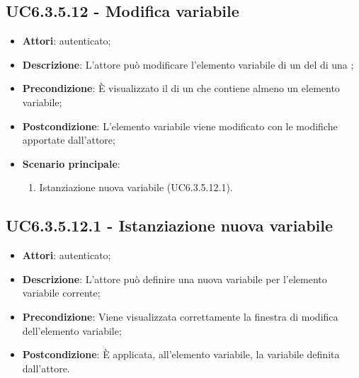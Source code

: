 \subsection{UC6.3.5.12 - Modifica variabile}
\label{ssec:UC6.3.5.12}
\begin{itemize}
\item \textbf{Attori}:  autenticato;
\item \textbf{Descrizione}: L'attore può modificare l'elemento variabile di un  del  di una ;
\item \textbf{Precondizione}: È visualizzato il  di un  che contiene almeno un elemento variabile;
\item \textbf{Postcondizione}: L'elemento variabile viene modificato con le modifiche apportate dall'attore;
\item \textbf{Scenario principale}: \begin{enumerate}\item Istanziazione nuova variabile (UC6.3.5.12.1).
 \end{enumerate}
\end{itemize}
\subsection{UC6.3.5.12.1 - Istanziazione nuova variabile}
\label{ssec:UC6.3.5.12.1}
\begin{itemize}
\item \textbf{Attori}:  autenticato;
\item \textbf{Descrizione}: L'attore può definire una nuova variabile per l'elemento variabile corrente;
\item \textbf{Precondizione}: Viene visualizzata correttamente la finestra di modifica dell'elemento variabile;
\item \textbf{Postcondizione}: È applicata, all'elemento variabile, la variabile definita dall'attore.
\end{itemize}
